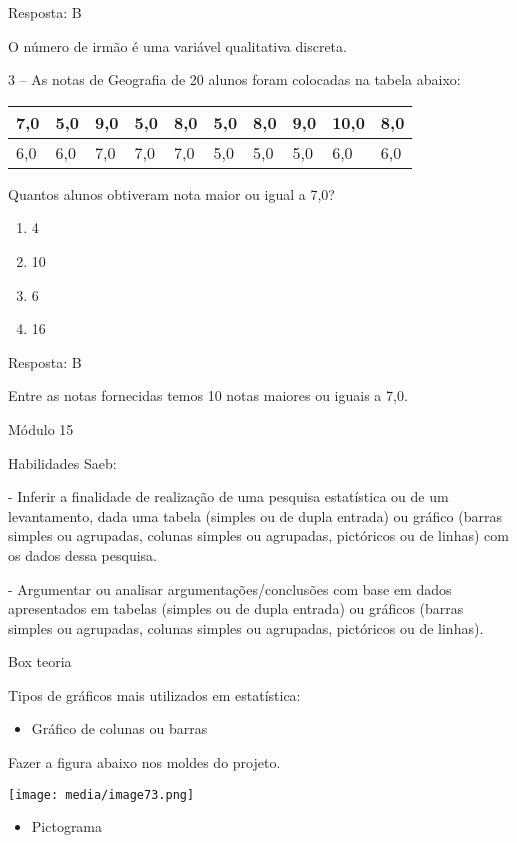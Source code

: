 Resposta: B

O número de irmão é uma variável qualitativa discreta.

3 -- As notas de Geografia de 20 alunos foram colocadas na tabela
abaixo:

\begin{longtable}[]{@{}llllllllll@{}}
\toprule
7,0 & 5,0 & 9,0 & 5,0 & 8,0 & 5,0 & 8,0 & 9,0 & 10,0 &
8,0\tabularnewline
\midrule
\endhead
6,0 & 6,0 & 7,0 & 7,0 & 7,0 & 5,0 & 5,0 & 5,0 & 6,0 & 6,0\tabularnewline
\bottomrule
\end{longtable}

Quantos alunos obtiveram nota maior ou igual a 7,0?

\begin{enumerate}
\def\labelenumi{\alph{enumi})}
\item
  4
\item
  10
\item
  6
\item
  16
\end{enumerate}

Resposta: B

Entre as notas fornecidas temos 10 notas maiores ou iguais a 7,0.

Módulo 15

Habilidades Saeb:

- Inferir a finalidade de realização de uma pesquisa estatística ou de
um levantamento, dada uma tabela (simples ou de dupla entrada) ou
gráfico (barras simples ou agrupadas, colunas simples ou agrupadas,
pictóricos ou de linhas) com os dados dessa pesquisa.

- Argumentar ou analisar argumentações/conclusões com base em dados
apresentados em tabelas (simples ou de dupla entrada) ou gráficos
(barras simples ou agrupadas, colunas simples ou agrupadas, pictóricos
ou de linhas).

Box teoria

Tipos de gráficos mais utilizados em estatística:

\begin{itemize}
\item
  Gráfico de colunas ou barras
\end{itemize}

Fazer a figura abaixo nos moldes do projeto.

\texttt{[image: media/image73.png]}

\begin{itemize}
\item
  Pictograma
\end{itemize}

